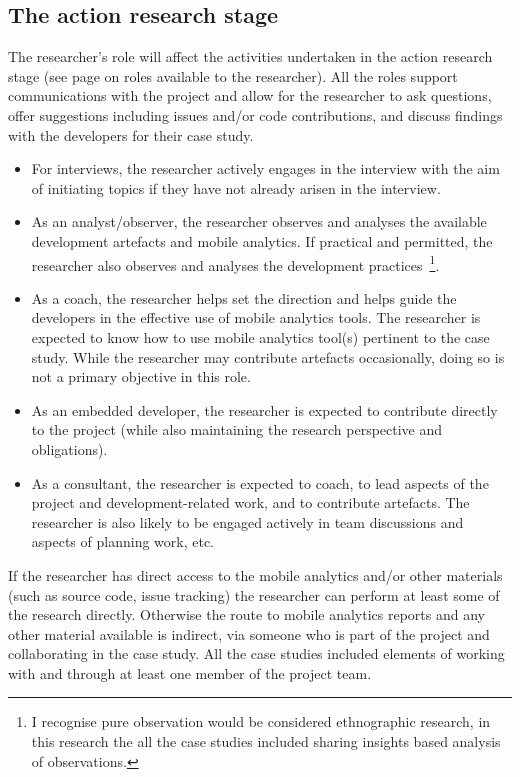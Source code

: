 \subsection{The action research stage}
 The researcher's role will affect the activities undertaken in the action research stage (see page \pageref{section-evaluation-through-action-research-method} on roles available to the researcher). All the roles support communications with the project and allow for the researcher to ask questions, offer suggestions including issues and/or code contributions, and discuss findings with the developers for their case study. 
\begin{itemize}
    \itemsep0em
    \item For interviews, the researcher actively engages in the interview with the aim of initiating topics if they have not already arisen in the interview.
    \item As an analyst/observer, the researcher observes and analyses the available development artefacts and mobile analytics. If practical and permitted, the researcher also observes and analyses the development practices~\footnote{I recognise pure observation would be considered ethnographic research, in this research the all the case studies included sharing insights based analysis of observations.}. 
    \item As a coach, the researcher helps set the direction and helps guide the developers in the effective use of mobile analytics tools. The researcher is expected to know how to use mobile analytics tool(s) pertinent to the case study. While the researcher may contribute artefacts occasionally, doing so is not a primary objective in this role.
    \item As an embedded developer, the researcher is expected to contribute directly to the project (while also maintaining the research perspective and obligations).
    \item As a consultant, the researcher is expected to coach, to lead aspects of the project and development-related work, and to contribute artefacts. The researcher is also likely to be engaged actively in team discussions and aspects of planning work, etc. 
\end{itemize}

If the researcher has direct access to the mobile analytics and/or other materials (such as source code, issue tracking) the researcher can perform at least some of the research directly. Otherwise the route to mobile analytics reports and any other material available is indirect, via someone who is part of the project and collaborating in the case study. All the case studies included elements of working with and through at least one member of the project team.

